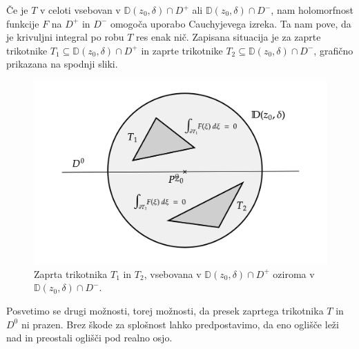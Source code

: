 \documentclass[mat1, tisk]{fmfdelo}
\begin{document}
\begin{dokaz}
        Če je $T$ v celoti vsebovan v $\mathbb{D}(z_0,\delta) \cap D^+$ ali $\mathbb{D}(z_0,\delta) \cap D^-$, nam holomorfnost funkcije $F$ na $D^+$ in $D^-$ omogoča uporabo Cauchyjevega izreka. 
        Ta nam pove, da je krivuljni integral po robu $T$ res enak nič. 
        Zapisana situacija je za zaprte trikotnike $T_1 \subseteq \mathbb{D}(z_0,\delta) \cap D^+$ in zaprte trikotnike $T_2 \subseteq \mathbb{D}(z_0,\delta) \cap D^-$, grafično prikazana na spodnji sliki. 
        \begin{figure}[H]
            \begin{center}
                \includegraphics[width = \textwidth]{schwarz_hol_1.png}
                \caption{Zaprta trikotnika $T_1$ in $T_2$, vsebovana v $\mathbb{D}(z_0,\delta) \cap D^+$ oziroma v $\mathbb{D}(z_0,\delta) \cap D^-$.}
            \end{center}    
        \end{figure}

        Posvetimo se drugi možnosti, torej možnosti, da presek zaprtega trikotnika $T$ in $D^0$ ni prazen. 
        Brez škode za splošnost lahko predpostavimo, da eno oglišče leži nad in preostali oglišči pod realno osjo.
        

\end{dokaz}
\end{document}
